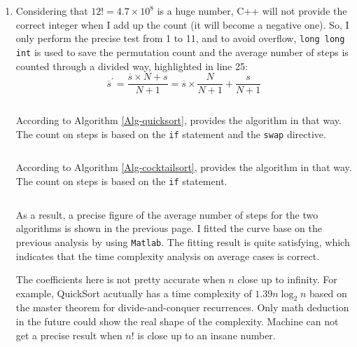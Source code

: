 \documentclass[12pt,a4paper]{article}
\makeatletter
\newtheorem*{solution}{Solution}
\theoremstyle{definition}
\renewenvironment{solution}[1][Solution] {\par\pushQED{\qed}\normalfont\topsep6\p@\@plus6\p@\relax\trivlist\item[\hskip\labelsep\bfseries#1\@addpunct{.}]\ignorespaces}{\popQED\endtrivlist\@endpefalse} \makeatother
\makeatother
\begin{document}
\begin{enumerate}
\begin{solution}
\begin{multicols}{2}
		Considering that $12!=4.7\times 10^8$ is a huge number, C++ will not provide the correct integer when I add up the count (it will become a negative one). So, I only perform the precise test from 1 to 11, and to avoid overflow, \texttt{long long int} is used to save the permutation count and the average number of steps is counted through a divided way, highlighted in line 25:
		\begin{equation*}
			\overline{s}^\prime = \frac{\overline{s}\times N+s}{N+1} = \overline{s}\times\frac{N}{N+1} + \frac{s}{N+1}
		\end{equation*}

		\inputminted[highlightlines={25}]{cpp}{alg/permutation.h} %

		According to Algorithm \ref{Alg-quicksort},  provides the algorithm in that way. The count on steps is based on the \texttt{if} statement and the \texttt{swap} directive. 

		\inputminted[highlightlines={10,13}]{cpp}{alg/quickSort.cpp} %

		According to Algorithm \ref{Alg-cocktailsort},  provides the algorithm in that way. The count on steps is based on the \texttt{if} statement.

		\inputminted[highlightlines={12,20}]{cpp}{alg/cockTailSort.cpp} %

		As a result, a precise figure of the average number of steps for the two algorithms is shown in the previous page. I fitted the curve base on the previous analysis by using \texttt{Matlab}. The fitting result is quite satisfying, which indicates that the time complexity analysis on average cases is correct. 
		
		The coefficients here is not pretty accurate when $n$ close up to infinity. For example, QuickSort acutually has a time complexity of $1.39n\log_2 n$ based on the master theorem for divide-and-conquer recurrences. Only math deduction in the future could show the real shape of the complexity. Machine can not get a precise result when $n!$ is close up to an insane number. 
	\end{multicols}


\end{solution}
\end{enumerate}
\end{document}
